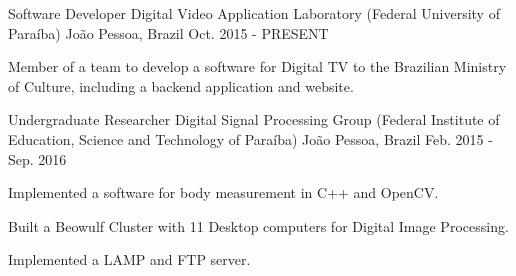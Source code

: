 

\begin{cventries}

  \cventry
    {Software Developer} %
    {Digital Video Application Laboratory (Federal University of Paraíba)} %
    {João Pessoa, Brazil} %
    {Oct. 2015 - PRESENT} %
    {
      \begin{cvitems} %
        \item {Member of a team to develop a software for Digital TV to the Brazilian Ministry of Culture, including a backend application and website.}
      \end{cvitems}
    }
    
  \cventry
    {Undergraduate Researcher} %
    {Digital Signal Processing Group (Federal Institute of Education, Science and Technology of Paraíba)} %
    {João Pessoa, Brazil} %
    {Feb. 2015 - Sep. 2016} %
    {
      \begin{cvitems} %
        \item {Implemented a software for body measurement in C++ and OpenCV.}
        \item {Built a Beowulf Cluster with 11 Desktop computers for Digital Image Processing.}
        \item {Implemented a LAMP and FTP server.}
      \end{cvitems}
    }


\end{cventries}
